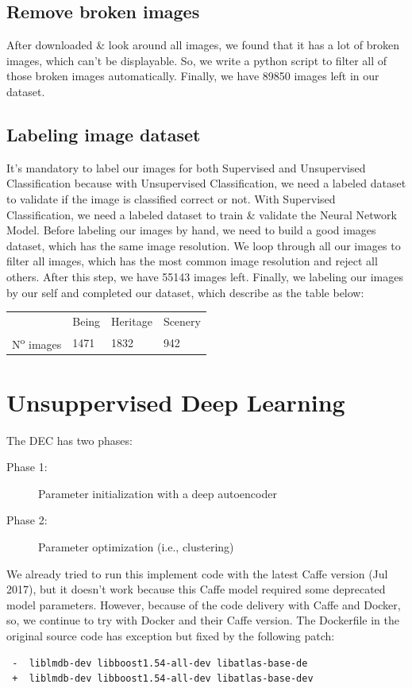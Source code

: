 \documentclass[hidelinks,12pt,a4paper]{report}
\begin{document}
\subsection{Remove broken images}
After downloaded \& look around all images, we found that it has a lot of broken images, which can't be displayable. So, we write a python script to filter all of those broken images automatically. \newline
Finally, we have 89850 images left in our dataset.

\subsection{Labeling image dataset}
It's mandatory to label our images for both Supervised and Unsupervised Classification because with Unsupervised Classification, we need a labeled dataset to validate if the image is classified correct or not. With Supervised Classification, we need a labeled dataset to train \& validate the Neural Network Model.\newline\newline
Before labeling our images by hand, we need to build a good images dataset, which has the same image resolution. We loop through all our images to filter all images, which has the most common image resolution and reject all others. After this step, we have 55143 images left. \newline\newline
Finally, we labeling our images by our self and completed our dataset, which describe as the table below:\newline\newline
{\renewcommand{\arraystretch}{2}%
\noindent\begin{tabularx}{\textwidth}{YYYY}
  \hline
& Being & Heritage & Scenery\\
N\textsuperscript{o} images & 1471 & 1832 & 942\\
 \hline
\end{tabularx}} \quad

\section{Unsuppervised Deep Learning}
The DEC has two phases:
\begin{description}
\item[Phase 1:]  Parameter initialization with a deep autoencoder
\item[Phase 2:]  Parameter optimization (i.e., clustering)
\end{description}
We already tried to run this implement code with the latest Caffe version (Jul 2017), but it doesn't work because this Caffe model required some deprecated model parameters. However, because of the code delivery with Caffe and Docker, so, we continue to try with Docker and their 
Caffe version.\newline\newline
The Dockerfile in the original source code has exception but fixed by the following patch:
\begin{verbatim}
 -  liblmdb-dev libboost1.54-all-dev libatlas-base-de
 +  liblmdb-dev libboost1.54-all-dev libatlas-base-dev
\end{verbatim}
\end{document}
